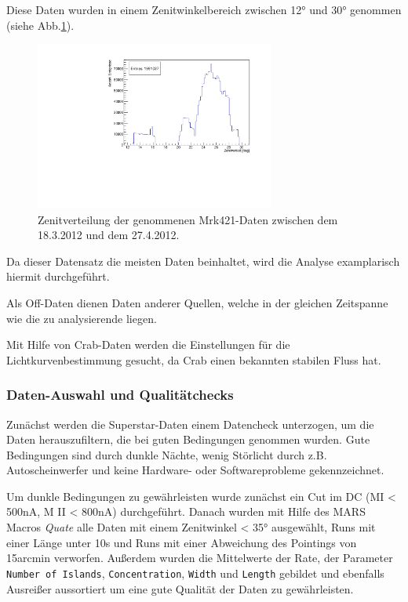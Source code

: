 Diese Daten wurden in einem Zenitwinkelbereich zwischen 12° und 30° genommen (siehe Abb.\ref{Datenset2_fZD}).

\begin{figure}
    \centering
    \includegraphics[width=0.7\textwidth]{./Plots/04_MrkAnalyse/Datenset2/Datenset2_Mrk421_MPointingPos_fZd.pdf}
    \caption{Zenitverteilung der genommenen Mrk421-Daten zwischen dem 18.3.2012 und dem 27.4.2012.}
    \label{Datenset2_fZD}
\end{figure}


Da dieser Datensatz die meisten Daten beinhaltet, wird die Analyse examplarisch hiermit durchgeführt.

Als Off-Daten dienen Daten anderer Quellen, welche in der gleichen Zeitspanne wie die zu analysierende liegen.

Mit Hilfe von Crab-Daten werden die Einstellungen für die Lichtkurvenbestimmung gesucht, da Crab einen bekannten stabilen Fluss hat. 


\subsubsection{Daten-Auswahl und Qualitätchecks}
Zunächst werden die Superstar-Daten einem Datencheck unterzogen, um die Daten herauszufiltern, die bei guten Bedingungen genommen wurden.
Gute Bedingungen sind durch dunkle Nächte, wenig Störlicht durch z.B. Autoscheinwerfer und keine Hardware- oder Softwareprobleme gekennzeichnet.

Um dunkle Bedingungen zu gewährleisten wurde zunächst ein Cut im DC (MI < 500nA, M II < 800nA) durchgeführt.
Danach wurden mit Hilfe des MARS Macros \textit{Quate} alle Daten mit einem Zenitwinkel < 35° ausgewählt, Runs mit einer Länge unter 10s und Runs mit einer Abweichung des Pointings von 15arcmin verworfen.
Außerdem wurden die Mittelwerte der Rate, der Parameter \texttt{Number of Islands}, \texttt{Concentration}, \texttt{Width} und \texttt{Length} gebildet und ebenfalls Ausreißer aussortiert um eine gute Qualität der Daten zu gewährleisten.

